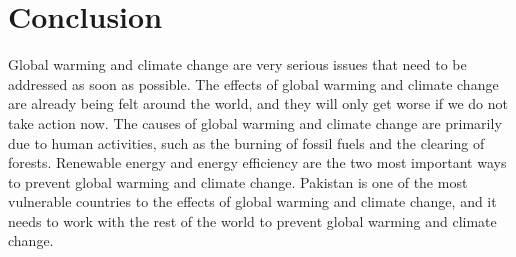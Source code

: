\documentclass{article}
\begin{document}
\section{Conclusion}
Global warming and climate change are very serious issues that need to be
addressed as soon as possible. The effects of global warming and climate change
are already being felt around the world, and they will only get worse if we do
not take action now. The causes of global warming and climate change are
primarily due to human activities, such as the burning of fossil fuels and the
clearing of forests. Renewable energy and energy efficiency are the two most
important ways to prevent global warming and climate change. Pakistan is one of
the most vulnerable countries to the effects of global warming and climate
change, and it needs to work with the rest of the world to prevent global
warming and climate change.
\newpage
\printbibliography
\end{document}
